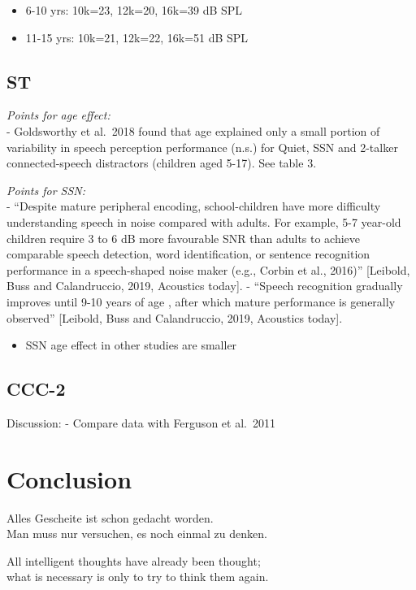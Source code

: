 \documentclass[a4paper, twoside]{templates/ociamthesis}
\providecommand{\tightlist}{%
  \setlength{\itemsep}{0pt}\setlength{\parskip}{0pt}}
\begin{document}
\begin{itemize}
\item
  6-10 yrs: 10k=23, 12k=20, 16k=39 dB SPL
\item
  11-15 yrs: 10k=21, 12k=22, 16k=51 dB SPL
\end{itemize}

\hypertarget{st-2}{%
\subsection{ST}\label{st-2}}

\emph{Points for age effect:}\\
- Goldsworthy et al.~2018 found that age explained only a small portion of variability in speech perception performance (n.s.) for Quiet, SSN and 2-talker connected-speech distractors (children aged 5-17). See table 3.

\emph{Points for SSN:}\\
- ``Despite mature peripheral encoding, school-children have more difficulty understanding speech in noise compared with adults. For example, 5-7 year-old children require 3 to 6 dB more favourable SNR than adults to achieve comparable speech detection, word identification, or sentence recognition performance in a speech-shaped noise maker (e.g., Corbin et al., 2016)'' {[}Leibold, Buss and Calandruccio, 2019, Acoustics today{]}. - ``Speech recognition gradually improves until 9-10 years of age , after which mature performance is generally observed'' {[}Leibold, Buss and Calandruccio, 2019, Acoustics today{]}.

\begin{itemize}
\tightlist
\item
  SSN age effect in other studies are smaller
\end{itemize}

\hypertarget{ccc-2-1}{%
\subsection{CCC-2}\label{ccc-2-1}}

Discussion: - Compare data with Ferguson et al.~2011

\hypertarget{conclusion-2}{%
\section{Conclusion}\label{conclusion-2}}

\clearpage

\begin{savequote}
Alles Gescheite ist schon gedacht worden.\\
Man muss nur versuchen, es noch einmal zu denken.

All intelligent thoughts have already been thought;\\
what is necessary is only to try to think them again.
\end{savequote}
\end{document}
